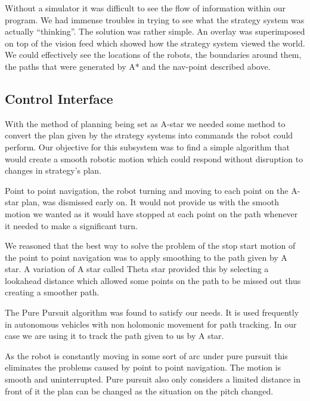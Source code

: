 
Without a simulator it was difficult to see the flow of information within our program. 
We had immense troubles in trying to see what the strategy system was actually “thinking”.
The solution was rather simple. An overlay was superimposed on top of the vision feed which 
showed how the strategy system viewed the world. We could effectively see the locations of 
the robots, the boundaries around them, the paths that were generated by A* and the 
nav-point described above. 


\subsection{Control Interface}

With the method of planning being set as A-star we needed some method to
convert the plan given by the strategy systems into commands the robot could
perform. Our objective for this subsystem was to find a simple algorithm that
would create a smooth robotic motion which could respond without disruption to
changes in strategy's plan.

Point to point navigation, the robot turning and moving to each point on the
A-star plan, was dismissed early on. It would not provide us with the smooth
motion we wanted as it would have stopped at each point on the path whenever it
needed to make a significant turn.

We reasoned that the best way to solve the problem of the stop start motion of
the point to point navigation was to apply smoothing to the path given by
A star. A variation of A star called Theta star provided this by selecting
a lookahead distance which allowed some points on the path to be missed out
thus creating a smoother path.

The Pure Pursuit algorithm was found to satisfy our needs. It is used
frequently in autonomous vehicles with non holomonic
movement for path tracking\cite{agvpp}\cite{coulterpp}. In our case we are
using it to track the path given to us by A star.

As the robot is constantly moving in some sort of arc under pure pursuit this
eliminates the problems caused by point to point navigation. The motion is
smooth and uninterrupted. Pure pursuit also only considers a limited distance
in front of it the plan can be changed as the situation on the pitch changed.

